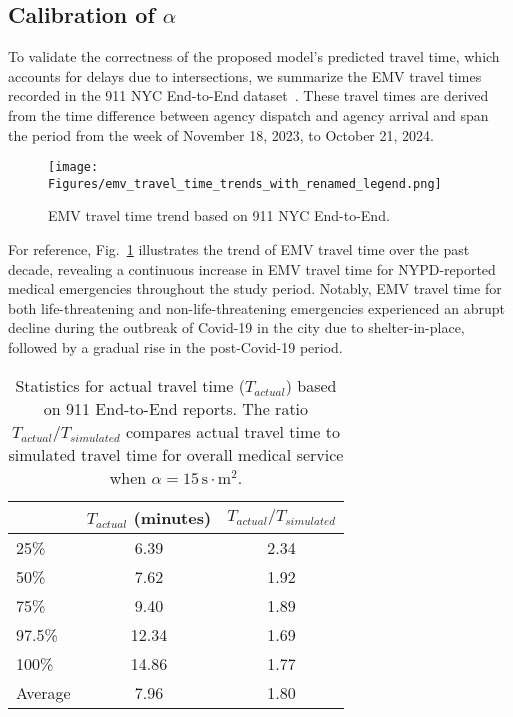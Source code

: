 \subsection{Calibration of \texorpdfstring{\boldmath$\alpha$}{alpha}}\label{subsec:comparison_w_real_world}
To validate the correctness of the proposed model’s predicted travel time, which accounts for delays due to intersections, we summarize the EMV travel times recorded in the 911 NYC End-to-End dataset~\cite{NYC911Data}. These travel times are derived from the time difference between agency dispatch and agency arrival and span the period from the week of November 18, 2023, to October 21, 2024.
\begin{figure}[h!]
    \centering
    \texttt{[image: Figures/emv\_travel\_time\_trends\_with\_renamed\_legend.png]}
    \caption{EMV travel time trend based on 911 NYC End-to-End.}
    \label{fig:emv_travel_time_trend}
\end{figure}
For reference, Fig.~\ref{fig:emv_travel_time_trend} illustrates the trend of EMV travel time over the past decade, revealing a continuous increase in EMV travel time for NYPD-reported medical emergencies throughout the study period. Notably, EMV travel time for both life-threatening and non-life-threatening emergencies experienced an abrupt decline during the outbreak of Covid-19 in the city due to shelter-in-place, followed by a gradual rise in the post-Covid-19 period.
\begin{table}
    \centering
    \renewcommand{\arraystretch}{1.2}
    \setlength{\tabcolsep}{6pt} 
    \begin{tabular}{lcc}
        \toprule
        \textbf{} & \textbf{$T_{actual}$ (minutes)} & \textbf{$T_{actual}/T_{simulated}$}\\
        \midrule
        25\% & 6.39 & 2.34\\
        50\% & 7.62 & 1.92\\
        75\% & 9.40 & 1.89\\
        97.5\% & 12.34 & 1.69\\
        100\% & 14.86 & 1.77\\
        Average & 7.96 & 1.80\\
        \bottomrule
    \end{tabular}
    \caption{Statistics for actual travel time ($T_{actual}$) based on 911 End-to-End reports. The ratio $T_{actual}/T_{simulated}$ compares actual travel time to simulated travel time for overall medical service when $\alpha = 15\,\text{s}\cdot\text{m}^2$.}
    \label{tab:real_statistics_travel_time}
\end{table}

